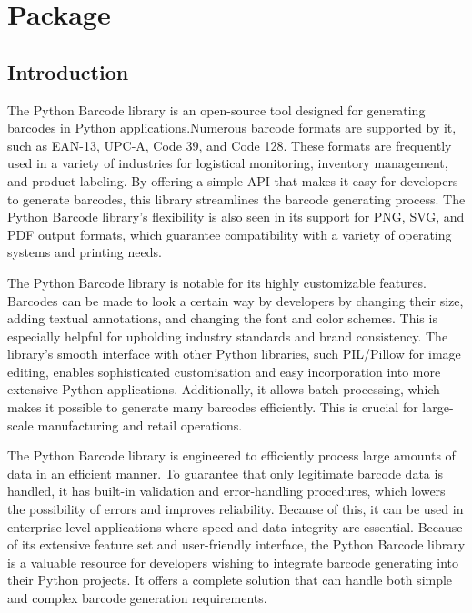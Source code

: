 %
%
%
%





\chapter{Package }

\section{Introduction}

The Python Barcode library is an open-source tool designed for generating barcodes in Python applications.Numerous barcode formats are supported by it, such as EAN-13, UPC-A, Code 39, and Code 128. These formats are frequently used in a variety of industries for logistical monitoring, inventory management, and product labeling. By offering a simple API that makes it easy for developers to generate barcodes, this library streamlines the barcode generating process. The Python Barcode library's flexibility is also seen in its support for PNG, SVG, and PDF output formats, which guarantee compatibility with a variety of operating systems and printing needs.

The Python Barcode library is notable for its highly customizable features. Barcodes can be made to look a certain way by developers by changing their size, adding textual annotations, and changing the font and color schemes. This is especially helpful for upholding industry standards and brand consistency. The library's smooth interface with other Python libraries, such PIL/Pillow for image editing, enables sophisticated customisation and easy incorporation into more extensive Python applications. Additionally, it allows batch processing, which makes it possible to generate many barcodes efficiently. This is crucial for large-scale manufacturing and retail operations\cite{Barrera:2020}.

The Python Barcode library is engineered to efficiently process large amounts of data in an efficient manner. To guarantee that only legitimate barcode data is handled, it has built-in validation and error-handling procedures, which lowers the possibility of errors and improves reliability. Because of this, it can be used in enterprise-level applications where speed and data integrity are essential. Because of its extensive feature set and user-friendly interface, the Python Barcode library is a valuable resource for developers wishing to integrate barcode generating into their Python projects. It offers a complete solution that can handle both simple and complex barcode generation requirements\cite{neubert:2023}.

